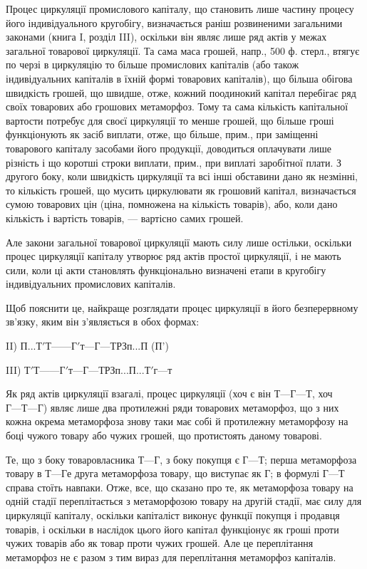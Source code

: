 Процес циркуляції промислового капіталу, що становить лише частину
процесу його індивідуального кругобігу, визначається раніш розвиненими
загальними законами (книга I, розділ III), оскільки він являє лише ряд
актів у межах загальної товарової циркуляції. Та сама маса грошей, напр.,
500 ф. стерл., втягує по черзі в циркуляцію то більше промислових капіталів
(або також індивідуальних капіталів в їхній формі товарових капіталів), що
більша обігова швидкість грошей, що швидше, отже, кожний поодинокий
капітал перебігає ряд своїх товарових або грошових метаморфоз. Тому
та сама кількість капітальної вартости потребує для своєї циркуляції то
менше грошей, що більше гроші функціонують як засіб виплати, отже,
що більше, прим., при заміщенні товарового капіталу засобами його продукції,
доводиться оплачувати лише різність і що коротші строки виплати,
прим., при виплаті заробітної плати. З другого боку, коли швидкість
циркуляції та всі інші обставини дано як незмінні, то кількість грошей,
що мусить циркулювати як грошовий капітал, визначається сумою товарових
цін (ціна, помножена на кількість товарів), або, коли дано кількість
і вартість товарів, — вартісно самих грошей.

Але закони загальної товарової циркуляції мають силу лише остільки,
оскільки процес циркуляції капіталу утворює ряд актів простої циркуляції,
і не мають сили, коли ці акти становлять функціонально визначені
етапи в кругобігу індивідуальних промислових капіталів.

Щоб пояснити це, найкраще розглядати процес циркуляції в його
безперервному зв’язку, яким він з’являється в обох формах:

II) $П... Т' Т — —Г' т —  Г — Т Р Зп... П$ (П')

III) $Т' Т — —Г' т —  Г — Т Р Зп... П... Т' г — т$

Як ряд актів циркуляції взагалі, процес циркуляції (хоч є він $Т — Г — Т$,
хоч $Г — Т — Г$) являє лише два протилежні ряди товарових метаморфоз,
що з них кожна окрема метаморфоза знову таки має собі й протилежну
метаморфозу на боці чужого товару або чужих грошей, що протистоять
даному товарові.

Те, що з боку товаровласника $Т — Г$, з боку покупця є $Г — Т$; перша
метаморфоза товару в $Т — Г$е друга метаморфоза товару, що виступає
як Г; в формулі $Г — Т$ справа стоїть навпаки. Отже, все, що сказано
про те, як метаморфоза товару на одній стадії переплітається з метаморфозою
товару на другій стадії, має силу для циркуляції капіталу,
оскільки капіталіст виконує функції покупця і продавця товарів, і
оскільки в наслідок цього його капітал функціонує як гроші проти
чужих товарів або як товар проти чужих грошей. Але це переплітання
метаморфоз не є разом з тим вираз для переплітання метаморфоз капіталів.
